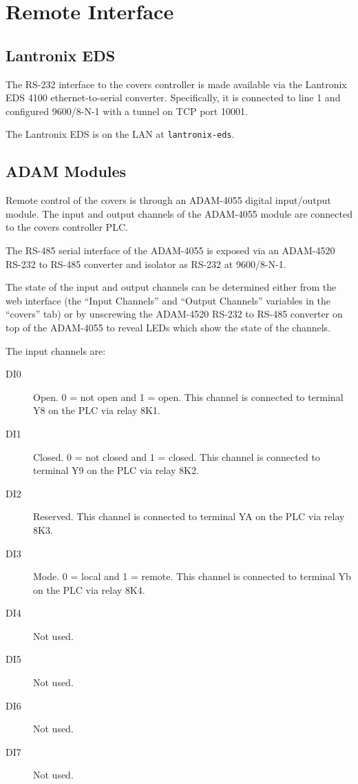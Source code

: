 \section{Remote Interface}
\label{section:covers-remote-interface}

\subsection{Lantronix EDS}
\label{section:covers-lantronix-eds}

The RS-232 interface to the covers controller is made available via the Lantronix EDS 4100 ethernet-to-serial converter. Specifically, it is connected to line 1 and configured 9600/8-N-1 with a tunnel on TCP port 10001.

The Lantronix EDS is on the LAN at \verb|lantronix-eds|.

\subsection{ADAM Modules}
\label{section:covers-adam-modules}

Remote control of the covers is through an ADAM-4055 digital input/output module. The input and output channels of the ADAM-4055 module are connected to the covers controller PLC.

The RS-485 serial interface of the ADAM-4055 is exposed via an ADAM-4520 RS-232 to RS-485 converter and isolator as RS-232 at 9600/8-N-1.

The state of the input and output channels can be determined either from the web interface (the “Input Channels” and “Output Channels” variables in the “covers” tab) or by unscrewing the ADAM-4520 RS-232 to RS-485 converter on top of the ADAM-4055 to reveal LEDs which show the state of the channels.

The input channels are:
\begin{description}
\item[DI0] Open. 0 = not open and 1 = open. This channel is connected to terminal Y8 on the PLC via relay 8K1.
\item[DI1] Closed. 0 = not closed and 1 = closed. This channel is connected to terminal Y9 on the PLC via relay 8K2.
\item[DI2] Reserved. This channel is connected to terminal YA on the PLC via relay 8K3.
\item[DI3] Mode. 0 = local and 1 = remote. This channel is connected to terminal Yb on the PLC via relay 8K4. 
\item[DI4] Not used.
\item[DI5] Not used.
\item[DI6] Not used.
\item[DI7] Not used.
\end{description}


